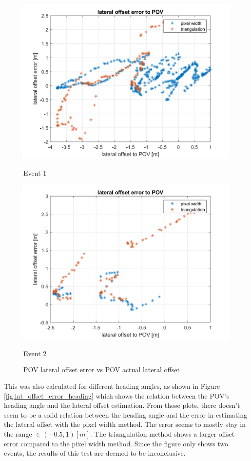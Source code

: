\begin{figure}[H]
\begin{minipage}[b]{0.49\textwidth}
    \includegraphics[width=\textwidth]{FiguresMat/range_error_lat_10794257.png}
    \caption*{Event 1}
\end{minipage}
\begin{minipage}[b]{0.50\textwidth}
    \includegraphics[width=\textwidth]{FiguresMat/range_error_lat_116147345.png}
    \caption*{Event 2}
\end{minipage}
\caption{POV lateral offset error vs POV actual lateral offset}
\label{fig:lat_offset_error_distance}
\end{figure}

This was also calculated for different heading angles, as shown in Figure \ref{fig:lat_offset_error_heading} which shows the relation between the POV's heading angle and the lateral offset estimation. From those plots, there doesn't seem to be a solid relation between the heading angle and the error in estimating the lateral offset with the pixel width method. The error seems to mostly stay in the range $\in(-0.5, 1)[m]$. The triangulation method shows a larger offset error compared to the pixel width method. Since the figure only shows two events, the results of this test are deemed to be inconclusive.

